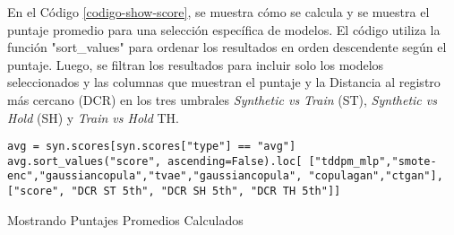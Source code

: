 En el Código \ref{codigo-show-score}, se muestra cómo se calcula y se muestra el puntaje promedio para una selección específica de modelos. El código utiliza la función "sort\_values" para ordenar los resultados en orden descendente según el puntaje. Luego, se filtran los resultados para incluir solo los modelos seleccionados y las columnas que muestran el puntaje y la Distancia al registro más cercano (DCR) en los tres umbrales \emph{Synthetic vs Train} (ST), \emph{Synthetic vs Hold} (SH) y \emph{Train vs Hold} TH.
\begin{listing}[H]
    \begin{verbatim}
avg = syn.scores[syn.scores["type"] == "avg"]
avg.sort_values("score", ascending=False).loc[ ["tddpm_mlp","smote-enc","gaussiancopula","tvae","gaussiancopula", "copulagan","ctgan"], ["score", "DCR ST 5th", "DCR SH 5th", "DCR TH 5th"]]
    \end{verbatim}
\caption{Mostrando Puntajes Promedios Calculados}
\label{codigo-show-score}
\end{listing}
